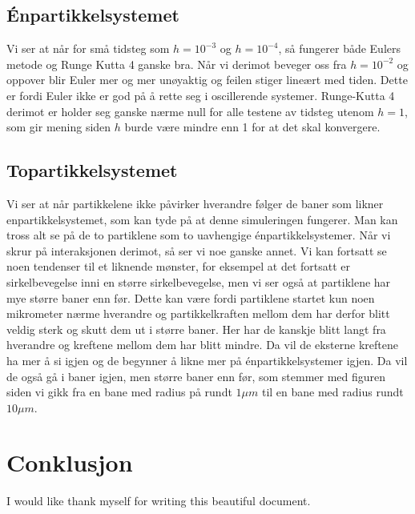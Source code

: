 \documentclass[reprint,english,notitlepage]{revtex4-1}  %
\begin{document}
\subsection*{Énpartikkelsystemet}
Vi ser at når for små tidsteg som $h=10^{-3}$ og $h=10^{-4}$, så fungerer både Eulers metode og Runge Kutta 4 ganske bra. Når vi derimot beveger oss fra $h=10^{-2}$ og oppover blir Euler mer og mer unøyaktig og feilen stiger lineært med tiden. Dette er fordi Euler ikke er god på å rette seg i oscillerende systemer.
\newline Runge-Kutta 4 derimot er holder seg ganske nærme null for alle testene av tidsteg utenom $h=1$, som gir mening siden $h$ burde være mindre enn 1 for at det skal konvergere.
\subsection*{Topartikkelsystemet}
Vi ser at når partikkelene ikke påvirker hverandre følger de baner som likner enpartikkelsystemet, som kan tyde på at denne simuleringen fungerer. Man kan tross alt se på de to partiklene som to uavhengige énpartikkelsystemer. Når vi skrur på interaksjonen derimot, så ser vi noe ganske annet. Vi kan fortsatt se noen tendenser til et liknende mønster, for eksempel at det fortsatt er sirkelbevegelse inni en større sirkelbevegelse, men vi ser også at partiklene har mye større baner enn før. Dette kan være fordi partiklene startet kun noen mikrometer nærme hverandre og partikkelkraften mellom dem har derfor blitt veldig sterk og skutt dem ut i større baner. Her har de kanskje blitt langt fra hverandre og kreftene mellom dem har blitt mindre. Da vil de eksterne kreftene ha mer å si igjen og de begynner å likne mer på énpartikkelsystemer igjen. Da vil de også gå i baner igjen, men større baner enn før, som stemmer med figuren siden vi gikk fra en bane med radius på rundt $1\mu m$ til en bane med radius rundt $10\mu m$.
\section{Conklusjon}
\begin{acknowledgments}  %
I would like thank myself for writing this beautiful document.
\end{acknowledgments}


\end{document}
